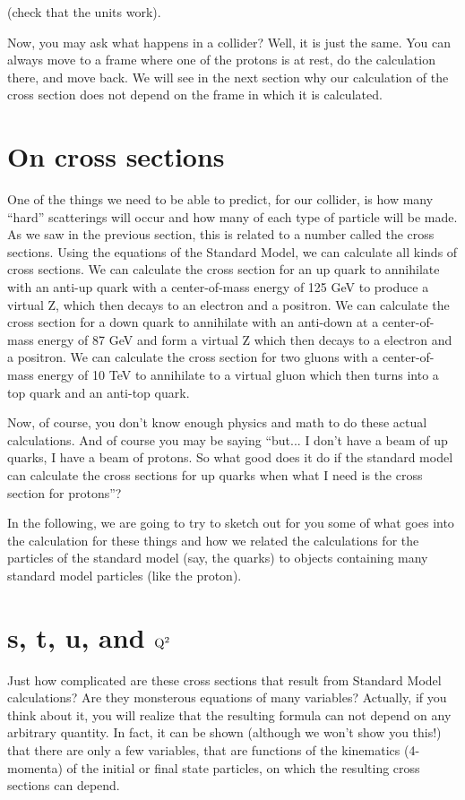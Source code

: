 (check that the units work).

Now, you may ask what happens in a collider?  Well, it is just the same.  You can always move to a frame where one of the protons is at rest, do the calculation there, and move back.  We will see in the next section why our calculation of the cross section does not depend on the frame in which it is calculated.

\section{On cross sections}
One of the things we need to be able to predict, for our collider, is how many ``hard'' scatterings will occur and how many of each type of particle will be made.  As we saw in the previous section, this is related to a number called the cross sections.  Using the equations of the Standard Model, we can calculate all kinds of cross sections.  We can calculate the cross section for an up quark to annihilate with an anti-up quark with a center-of-mass energy of 125 GeV to produce a virtual Z, which then decays to an electron and a positron.  We can calculate the cross section for a down quark to annihilate with an anti-down at a center-of-mass energy of 87 GeV and form a virtual Z which then decays to a electron and a positron.  We can calculate the cross section for two gluons with a center-of-mass energy of 10 TeV to annihilate to a virtual gluon which then turns into a top quark and an anti-top quark.  

Now, of course, you don't know enough physics and math to do these actual calculations.  And of course you may be saying ``but...  I don't have a beam of up quarks, I have a beam of protons.  So what good does it do if the standard model can calculate the cross sections for up quarks when what I need is the cross section for protons''?

In the following, we are going to try to sketch out for you some of what goes into the calculation for these things and how we related the calculations for the particles of the standard model (say, the quarks) to objects containing many standard model particles (like the proton).

\section{s, t, u, and ${\rm Q^2}$}

Just how complicated are these cross sections that result from Standard Model calculations?  
Are they monsterous equations of many variables?
Actually, if you think about it, you will realize that the resulting formula can not 
depend on any arbitrary quantity.  In fact, it can be shown (although we won't show you this!)
that there are only a few variables, that are functions of the kinematics (4-momenta) of the initial or final state particles, on which the resulting cross sections can depend.

